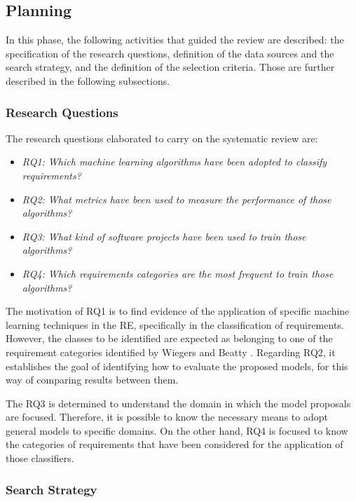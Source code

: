 \documentclass[conference]{IEEEtran}
\begin{document}
\subsection{Planning}

In this phase, the following activities that guided the review are described: the specification of the research questions, definition of the data sources and the search strategy, and the definition of the selection criteria. Those are further described in the following subsections.

\subsubsection{Research Questions}

The research questions elaborated to carry on the systematic review are:

\begin{itemize}
  \item \textit{RQ1: Which machine learning algorithms have been adopted to classify requirements?}
  \item \textit{RQ2: What metrics have been used to measure the performance of those algorithms?}
  \item \textit{RQ3: What kind of software projects have been used to train those algorithms?}
  \item \textit{RQ4: Which requirements categories are the most frequent to train those algorithms?}
\end{itemize}

The motivation of RQ1 is to find evidence of the application of specific machine learning techniques in the RE, specifically in the classification of requirements. However, the classes to be identified are expected as belonging to one of the requirement categories identified by Wiegers and Beatty \cite{Wiegers2013}. Regarding RQ2, it establishes the goal of identifying how to evaluate the proposed models, for this way of comparing results between them.

The RQ3 is determined to understand the domain in which the model proposals are focused. Therefore, it is possible to know the necessary means to adopt general models to specific domains. On the other hand, RQ4 is focused to know the categories of requirements that have been considered for the application of those classifiers.

\subsubsection{Search Strategy}
\end{document}
